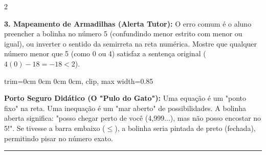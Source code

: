 \begin{multicols*}{2}
\begin{tcolorbox}[colback=CorTitUm!5, colframe=CorTitUm, boxrule=1pt, arc=4pt, left=6pt, right=6pt, top=6pt, bottom=6pt]
    \textbf{3. Mapeamento de Armadilhas (Alerta Tutor):} O erro comum é o aluno preencher a bolinha no número 5 (confundindo menor estrito com menor ou igual), ou inverter o sentido da semirreta na reta numérica. Mostre que qualquer número menor que 5 (como 0 ou 4) satisfaz a sentença original ($4(0) - 18 = -18 < 2$).
    
    \begin{center}
    \begin{adjustbox}{trim=0cm 0cm 0cm 0cm, clip, max width=0.85\linewidth}
    \end{adjustbox}
    \end{center}
    \end{tcolorbox}
    \vspace{0.15cm}
    
    \begin{boxexplicacao}
    \textbf{Porto Seguro Didático (O "Pulo do Gato"):} Uma equação é um "ponto fixo" na reta. Uma inequação é um "mar aberto" de possibilidades. A bolinha aberta significa: "posso chegar perto de você (4,999...), mas não posso encostar no 5!". Se tivesse a barra embaixo ($\le$), a bolinha seria pintada de preto (fechada), permitindo pisar no número exato.
    \end{boxexplicacao}
\fi

\par\vspace{\espacoQuestao}


\noindent\textcolor{CorLinha}{\rule{\linewidth}{0.5pt}} 
\par\vspace{\espacoPreQuestao}

\end{multicols*}

